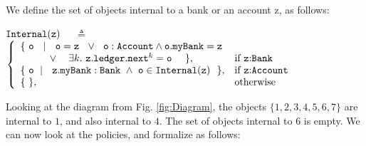 \documentclass[acmsmall,screen]{acmart}
\begin{document}
 
\begin{definition}
\label{def:internal}
We define  the set of objects    internal to a bank  or an account  z,  as follows:

%


${\mbox{\tt{Internal}}}({\mbox{\tt{z}}})$ \ \  $\triangleq$ \ \
$\left\{
  \begin{array}{ll}
     \{\ \prg{o}\ \ \mid\     \ \prg{o} = \prg{z}\ \ \vee\  \ \prg{o}:\prg{Account}\wedge \prg{o}.\prg{myBank}=\prg{z} \\
 \strut \hspace{0.96cm} \vee\ \ \ \exists k. \ \prg{z}.\prg{ledger}.\prg{next}^k = \prg{o} \ \ \ \ \} , 
  & \hbox{if \prg{z}:\prg{Bank}} \\
   \{\ \prg{o}\ \mid\   \
 \prg{z}.\prg{myBank} :\prg{Bank}\ \wedge\  \prg{o}\in \prg{Internal}(\prg{z})\ \ \},  
& \hbox{if \prg{z}:\prg{Account}}\\
\{ \ \}, & \hbox{otherwise}
  \end{array} 
\right.$
\end{definition}

Looking at the diagram from Fig. \ref{fig:Diagram}, the objects $\{ 1, 2, 3, 4, 5, 6, 7 \}$  are internal to $1$, and  also internal to $4$. The set of objects internal to $6$ is empty.
We can now look at the policies, and formalize  as follows:
\end{document}
